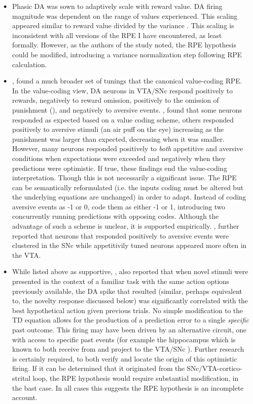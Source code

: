 \documentclass[doc]{apa}        %
\begin{document}
\begin{itemize}
	\item Phasic DA was sown to adaptively scale with reward value.  DA firing magnitude was dependent on the range of values experienced.  This scaling appeared similar to reward value divided by the variance \cite{Tobler:2005p6373}.  This scaling is inconsistent with all versions of the RPE I have encountered, as least formally.  However, as the authors of the study noted, the RPE hypothesis could be modified, introducing a variance normalization step following RPE calculation.
\item {}, found a much broader set of tunings that the canonical value-coding RPE.   In the value-coding view, DA neurons in VTA/SNc respond positively to rewards, negatively to reward omission, positively to the omission of punishment (\cite{Kim:2006p1063}), and negatively to aversive events.  , found that some neurons responded as expected based on a value coding scheme, others responded positively to aversive stimuli (an air puff on the eye) increasing as the punishment was larger than expected, decreasing when it was smaller.  However, many neurons responded positively to \emph{both} appetitive and aversive conditions when expectations were exceeded and negatively when they predictions were optimistic.  If true, these findings end the value-coding interpretation.  Though this is not necessarily a significant issue.  The RPE can be semantically reformulated (i.e. the inputs coding must be altered but the underlying equations are unchanged) in order to adapt. Instead of coding aversive events as -1 or 0, code them as either -1 or 1, introducing two concurrently running predictions with opposing codes.  Although the advantage of such a scheme is unclear, it is supported empirically.  , further reported that neurons that responded positively to aversive events were clustered in the SNc while appetitivily tuned neurons appeared more often in the VTA.  
\item While listed above as supportive, , also reported that when novel stimuli were presented in the context of a familiar task with the same action options previously available, the DA spike that resulted (similar, perhaps equivalent to, the novelty response discussed below) was significantly correlated with the best hypothetical action given previous trials.  No simple modification to the TD equation allows for the production of a prediction error to a single \emph{specific} past outcome.  This firing may have been driven by an alternative circuit, one with access to specific past events (for example the hippocampus which is known to both receive from and project to the VTA/SNc \cite{Lisman:2005p5455}).  Further research is certainly required, to both verify and locate the origin of this optimistic firing.  If it can be determined that it originated from the SNc/VTA-cortico-strital loop, the RPE hypothesis would require substantial modification, in the bast case.  In all cases this suggests the RPE hypothesis is an incomplete account.

\end{itemize}
\end{document}
